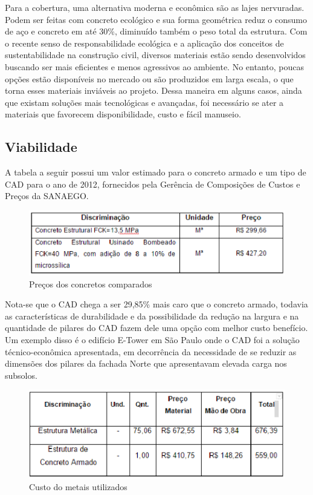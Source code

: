 Para a cobertura, uma alternativa moderna e econômica são as lajes nervuradas. Podem ser feitas com concreto ecológico e sua forma geométrica reduz o consumo de aço e concreto em até 30\%, diminuído também o peso total da estrutura.
Com o recente senso de responsabilidade ecológica e a aplicação dos conceitos de sustentabilidade na construção civil, diversos materiais estão sendo desenvolvidos buscando ser mais eficientes e menos agressivos ao ambiente. No entanto, poucas opções estão disponíveis no mercado ou são produzidos em larga escala, o que torna esses materiais inviáveis ao projeto. Dessa maneira em alguns casos, ainda que existam soluções mais tecnológicas e avançadas, foi necessário se ater a materiais que favorecem disponibilidade, custo e fácil manuseio.

\subsection{Viabilidade}

A tabela a seguir possui um valor estimado para o concreto armado e um tipo de CAD para o ano de 2012, fornecidos pela Gerência de Composições de Custos e Preços da SANAEGO.

\begin{figure}[!ht]
\centering
\includegraphics[keepaspectratio=true,scale=1]{figuras/tabela_com_precos_concreto.eps}
\caption{  Preços dos concretos comparados
}
\end{figure}

Nota-se que o CAD chega a ser 29,85\% mais caro que o concreto armado, todavia as características de durabilidade e da possibilidade da redução na largura e na quantidade de pilares do CAD fazem dele uma opção com melhor custo benefício. Um exemplo disso é o edifício E-Tower em São Paulo onde o CAD foi a solução técnico-econômica apresentada, em decorrência da necessidade de se reduzir as dimensões dos pilares da fachada Norte que apresentavam elevada carga nos subsolos.

\begin{figure}[!ht]
\centering
\includegraphics[keepaspectratio=true,scale=1]{figuras/precometais.eps}
\caption{Custo do metais utilizados}
\end{figure}

